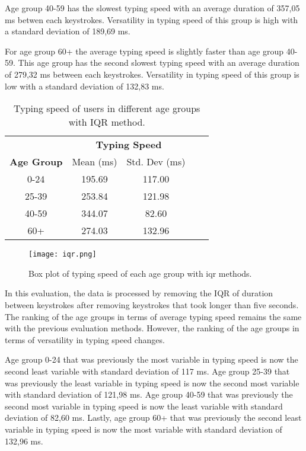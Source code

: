 Age group 40-59 has the slowest typing speed with an average duration of 357,05 ms betwen each keystrokes.
Versatility in typing speed of this group is high with a standard deviation of 189,69 ms.

For age group 60+ the average typing speed is slightly faster than age group 40-59.
This age group has the second slowest typing speed with an average duration of 279,32 ms between each keystrokes.
Versatility in typing speed of this group is low with a standard deviation of 132,83 ms.

\begin{table}[h]
    \centering
    \begin{tabular}{ccccc}
    \toprule
    \multicolumn{1}{c}{} & \multicolumn{2}{c}{\textbf{Typing Speed}}\\
    \cmidrule(rl){2-3} \cmidrule(rl){4-5}
    \textbf{Age Group} & {Mean (ms)} & {Std. Dev (ms)} \\
    \midrule
    0-24 & 195.69 & 117.00 \\
    25-39 & 253.84 & 121.98  \\
    40-59 & 344.07 & 82.60  \\
    60+ & 274.03 & 132.96 \\
    \bottomrule
    \end{tabular}
    \caption{Typing speed of users in different age groups with \ac{IQR} method.}
    \label{tab:typing_behavior_iqr}
\end{table}


\begin{figure}[h!]
    \centering
    \texttt{[image: iqr.png]}
    \caption{Box plot of typing speed of each age group with iqr methods.}
    \label{box_plot_typing_speed_iqr}
\end{figure}

In this evaluation, the data is processed by removing the \ac{IQR} of duration between keystrokes after removing keystrokes that took longer than five seconds.
The ranking of the age groups in terms of average typing speed remains the same with the previous evaluation methods.
However, the ranking of the age groups in terms of versatility in typing speed changes.

Age group 0-24 that was previously the most variable in typing speed is now the second least variable with standard deviation of 117 ms.
Age group 25-39 that was previously the least variable in typing speed is now the second most variable with standard deviation of 121,98 ms.
Age group 40-59 that was previously the second most variable in typing speed is now the least variable with standard deviation of 82,60 ms.
Lastly, age group 60+ that was previously the second least variable in typing speed is now the most variable with standard deviation of 132,96 ms. 

